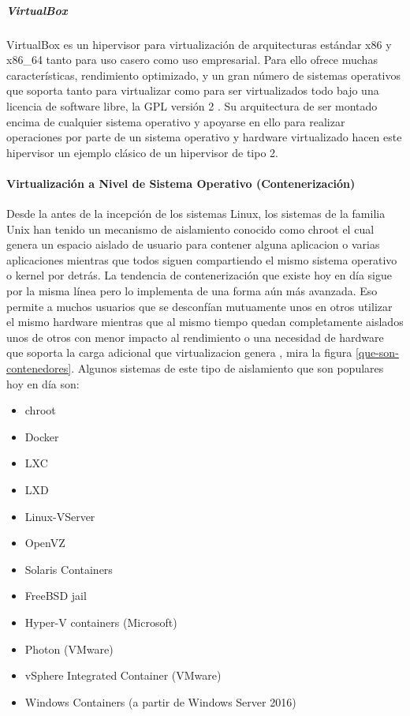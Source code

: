 \subparagraph{VirtualBox}
VirtualBox es un hipervisor para virtualización de arquitecturas estándar x86 y x86\_64 tanto para uso casero como uso empresarial. Para ello ofrece muchas características, rendimiento optimizado, y un gran número de sistemas operativos que soporta tanto para virtualizar como para ser virtualizados todo bajo una licencia de software libre, la GPL versión 2 \citep{VirtualBox}. Su arquitectura de ser montado encima de cualquier sistema operativo y apoyarse en ello para realizar operaciones por parte de un sistema operativo y hardware virtualizado hacen este hipervisor un ejemplo clásico de un hipervisor de tipo 2.

\paragraph{Virtualización a Nivel de Sistema Operativo (Contenerización)}
Desde la antes de la incepción de los sistemas Linux, los sistemas de la familia Unix han tenido un mecanismo de aislamiento conocido como chroot el cual genera un espacio aislado de usuario para contener alguna aplicacion o varias aplicaciones mientras que todos siguen compartiendo el mismo sistema operativo o kernel por detrás. La tendencia de contenerización que existe hoy en día sigue por la misma línea pero lo implementa de una forma aún más avanzada. Eso permite a muchos usuarios que se desconfían mutuamente unos en otros utilizar el mismo hardware mientras que al mismo tiempo quedan completamente aislados unos de otros con menor impacto al rendimiento o una necesidad de hardware que soporta la carga adicional que virtualizacion genera \citep{Teimouri-Davoud-OS-level-virt}, mira la figura \ref{que-son-contenedores}. Algunos sistemas de este tipo de aislamiento que son populares hoy en día son:
\begin{multicols}{3}
  \begin{itemize}
      \item chroot
      \item Docker
      \item LXC
      \item LXD
      \item Linux-VServer
      \item OpenVZ
      \item Solaris Containers
      \item FreeBSD jail
      \item Hyper-V containers (Microsoft)
      \item Photon (VMware)
  \end{itemize}
\end{multicols}
\begin{multicols}{2}
	\begin{itemize}
	    \item vSphere Integrated Container (VMware)
	    \item Windows Containers (a partir de Windows Server 2016)
	\end{itemize}
\end{multicols}

